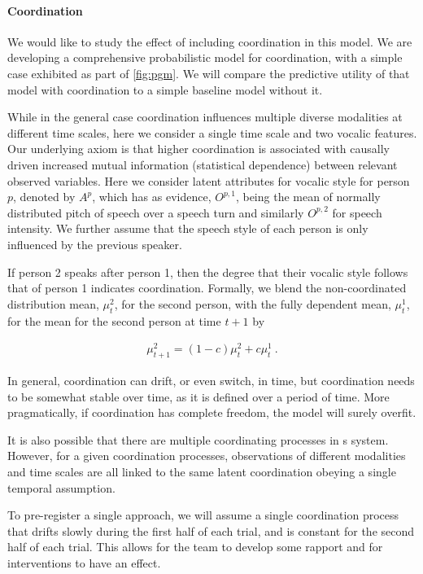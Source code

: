     \paragraph{Coordination} We would like to study the effect of including
    coordination in this model.  We are developing a comprehensive
    probabilistic model for coordination, with a simple case exhibited as part
    of \autoref{fig:pgm}.  We will compare the predictive utility of that model
    with coordination to a simple baseline model without it.

    While in the general case coordination influences multiple diverse
    modalities at different time scales, here we consider a single time scale
    and two vocalic features.  Our underlying axiom is that higher coordination
    is associated with causally driven increased mutual information (statistical
    dependence) between relevant observed variables. Here we consider latent
    attributes for vocalic style for person $p$, denoted by $A^{p}$, which has
    as evidence, $O^{p,1}$, being the mean of normally distributed pitch of
    speech over a speech turn and similarly $O^{p,2}$ for speech intensity.  We
    further assume that the speech style of each person is only influenced by
    the previous speaker.

    If person 2 speaks after person 1, then the degree that their vocalic style
    follows that of person 1 indicates coordination. Formally, we blend the
    non-coordinated distribution mean, $\mu^2_t$, for the second person, with
    the fully dependent mean, $\mu^1_t$, for the mean for the second person at
    time $t+1$ by

    \begin{align}
        \mu^2_{t+1} = (1-c) \mu^2_t + c\mu^1_t ~.
    \end{align}

    In general, coordination can drift, or even switch, in time, but
    coordination needs to be somewhat stable over time, as it is defined over a
    period of time. More pragmatically, if coordination has complete freedom,
    the model will surely overfit.

    It is also possible that there are multiple coordinating processes in s
    system. However, for a given coordination processes, observations of
    different modalities and time scales are all linked to the same latent
    coordination obeying a single temporal assumption.

    To pre-register a single approach, we will assume a single coordination
    process that drifts slowly during the first half of each trial, and is
    constant for the second half of each trial. This allows for the team to
    develop some rapport and for interventions to have an effect.

